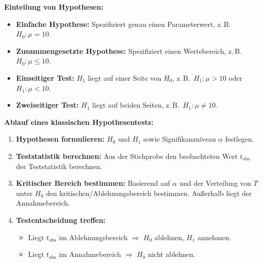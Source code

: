 \textbf{Einteilung von Hypothesen:}
\begin{itemize}[leftmargin=1.5em]
    \item \textbf{Einfache Hypothese:} Spezifiziert genau einen Parameterwert, z.\,B.\ $H_0: \mu = 10$.
    \item \textbf{Zusammengesetzte Hypothese:} Spezifiziert einen Wertebereich, z.\,B.\ $H_0: \mu \leq 10$.
    \item \textbf{Einseitiger Test:} $H_1$ liegt auf einer Seite von $H_0$, z.\,B.\ $H_1: \mu > 10$ oder $H_1: \mu < 10$.
    \item \textbf{Zweiseitiger Test:} $H_1$ liegt auf beiden Seiten, z.\,B.\ $H_1: \mu \neq 10$.
\end{itemize}



\textbf{Ablauf eines klassischen Hypothesentests:}

\begin{enumerate}[leftmargin=1.5em]
    \item \textbf{Hypothesen formulieren:} $H_0$ und $H_1$ sowie Signifikanzniveau $\alpha$ festlegen.
    \item \textbf{Teststatistik berechnen:} Aus der Stichprobe den beobachteten Wert $t_{\text{obs}}$ der Teststatistik berechnen.
    \item \textbf{Kritischer Bereich bestimmen:} Basierend auf $\alpha$ und der Verteilung von $T$ unter $H_0$ den kritischen/Ablehnungsbereich bestimmen. Außerhalb liegt der Annahmebereich.
    \item \textbf{Testentscheidung treffen:} 
    \begin{itemize}
        \item Liegt $t_{\text{obs}}$ im Ablehnungsbereich $\Rightarrow$ $H_0$ ablehnen, $H_1$ annehmen.
        \item Liegt $t_{\text{obs}}$ im Annahmebereich $\Rightarrow$ $H_0$ nicht ablehnen.
    \end{itemize}
\end{enumerate}

